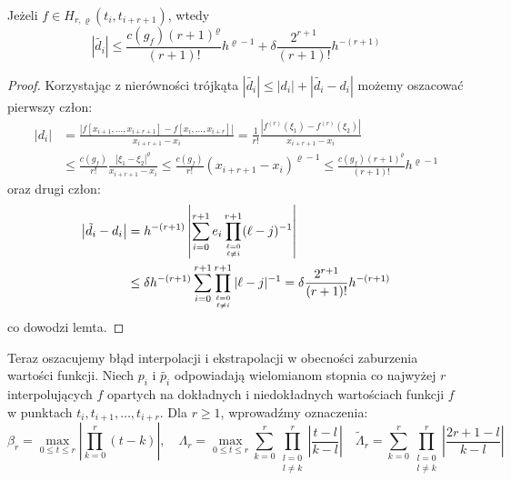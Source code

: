\documentclass[oik, pdftex, robocza, man]{mgrwms}
\begin{document}
    \begin{lemma} \label{lem:algMP_1}
        Jeżeli $f \in H_{r, \varrho}(t_{i}, t_{i+r+1})$, wtedy
        \begin{equation*}
            |\tilde{d_{i}}| \leq \frac{c(g_{f})(r+1)^{\varrho}}{(r+1)!} h^{\varrho-1} + \delta \frac{2^{r+1}}{(r+1)!} h^{-(r+1)}
        \end{equation*}
    \end{lemma}
    \begin{proof}
        Korzystając z nierówności trójkąta $|\tilde{d_{i}}|  \leq |d_{i}| + |\tilde{d_{i}} - d_{i}|$ możemy oszacować pierwszy człon:
        \begin{equation}
            \begin{aligned}
            \left|d_{i}\right| &=\frac{\left|f\left[x_{i+1}, \ldots, x_{i+r+1}\right]-f\left[x_{i}, \ldots, x_{i+r}\right]\right|}{x_{i+r+1}-x_{i}} 
                = \frac{1}{r !} \frac{\left|f^{(r)}\left(\xi_{1}\right)-f^{(r)}\left(\xi_{2}\right)\right|}{x_{i+r+1}-x_{i}} \\
            & \leq \frac{c\left(g_{f}\right)}{r !} \frac{\left|\xi_{1}-\xi_{2}\right|^{\varrho}}{x_{i+r+1}-x_{i}} 
                \leq \frac{c\left(g_{f}\right)}{r !}\left(x_{i+r+1}-x_{i}\right)^{\varrho-1} 
                \leq \frac{c\left(g_{f}\right)(r+1)^{\varrho}}{(r+1) !} h^{\varrho-1}
            \end{aligned}
        \end{equation}
        oraz drugi człon:
        \begin{equation}
            \begin{aligned}
            \left|\tilde{d}_{i}-d_{i}\right| & =h^{-(r+1)}\left|\sum_{i=0}^{r+1} e_{i} \prod_{\ell=0 \atop \ell \neq i}^{r+1}(\ell-j)^{-1}\right| \\
            & \leq \delta h^{-(r+1)} \sum_{i=0}^{r+1} \prod_{\ell=0 \atop \ell \neq i}^{r+1}|\ell-j|^{-1}=\delta \frac{2^{r+1}}{(r+1) !} h^{-(r+1)}
            \end{aligned}
        \end{equation}
        co dowodzi lemta.
    \end{proof}

    Teraz oszacujemy błąd interpolacji i ekstrapolacji w obecności zaburzenia wartości funkcji. Niech $p_{i}$ i $\tilde{p_{i}}$ odpowiadają wielomianom stopnia co najwyżej $r$ interpolujących $f$ opartych na dokładnych i niedokładnych wartościach funkcji $f$ w punktach $t_{i}, t_{i+1}, \dots, t_{i+r}$. Dla $r \geq 1$, wprowadźmy oznaczenia:
    \begin{equation*}
        \beta_{r} = \max_{0 \leq t \leq r} \left|\prod_{k=0}^{r} (t-k)\right|, \quad
        \Lambda_{r} = \max_{0 \leq t \leq r} \sum_{k=0}^{r} \prod_{\substack{l=0 \\ l \neq k}}^{r} \left| \frac{t-l}{k-l} \right| \quad
        \tilde{\Lambda}_{r} = \sum_{k=0}^{r} \prod_{\substack{l=0 \\ l \neq k}}^{r} \left| \frac{2r+1-l}{k-l} \right|
    \end{equation*}
\end{document}
